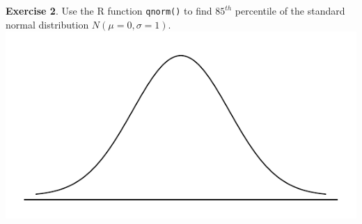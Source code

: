 \documentclass[11pt]{article}\usepackage[]{graphicx}\usepackage[]{color}
\begin{document}
\textbf{Exercise 2}.  Use the R function \texttt{qnorm()} to find $85^{th}$ percentile of the standard normal distribution $N(\mu = 0, \sigma = 1)$.\\

\includegraphics[scale=0.5]{figure/norm_draw.pdf}
\bigskip

\newpage
\end{document}
